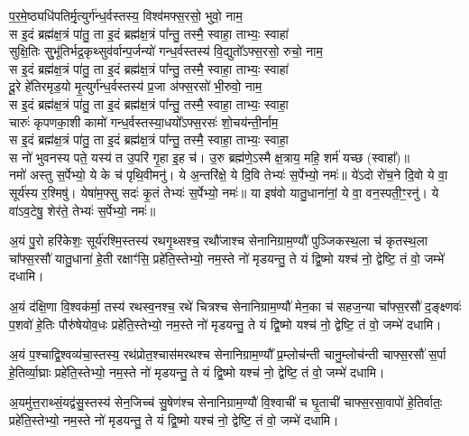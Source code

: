 प॒र॒मे॒ष्ठ्यधि॑पतिर्मृ॒त्युर्ग॑न्ध॒र्वस्तस्य॒ विश्व॑मफ्स॒रसो॒ भुवो॒  नाम॒\\
स इ॒दं ब्रह्म॑क्ष॒त्रं पा॑तु॒ ता इ॒दं ब्रह्म॑क्ष॒त्रं पा᳚न्तु॒ तस्मै॒ स्वाहा॒ ताभ्यः॒ स्वाहा॑\\
सुक्षि॒तिः सुुभू॑तिर्भद्र॒कृथ्सुव॑र्वान्प॒र्जन्यो॑ गन्ध॒र्वस्तस्य॑ वि॒द्युतो᳚ऽफ्स॒रसो॒ रुचो॒ नाम॒\\
स इ॒दं ब्रह्म॑क्ष॒त्रं पा॑तु॒ ता इ॒दं ब्रह्म॑क्ष॒त्रं पा᳚न्तु॒ तस्मै॒ स्वाहा॒ ताभ्यः॒ स्वाहा॑\\
दू॒रे हे॑तिरमृड॒यो मृ॒त्युर्ग॑न्ध॒र्वस्तस्य॑ प्र॒जा अ॑फ्स॒रसो॑ भी॒रुवो॒ नाम॒\\
स इ॒दं ब्रह्म॑क्ष॒त्रं पा॑तु॒ ता इ॒दं ब्रह्म॑क्ष॒त्रं पा᳚न्तु॒ तस्मै॒ स्वाहा॒ ताभ्यः॒ स्वाहा॒\\
चारुः॑ कृपणका॒शी कामो॑ गन्ध॒र्वस्तस्या॒धयो᳚ऽफ्स॒रसः॑ शो॒चय॑न्ती॒र्नाम॒\\
स इ॒दं ब्रह्म॑क्ष॒त्रं पा॑तु॒ ता इ॒दं ब्रह्म॑क्ष॒त्रं पा᳚न्तु॒ तस्मै॒ स्वाहा॒ ताभ्यः॒ स्वाहा॒\\
स नो॑ भुवनस्य पते॒ यस्य॑ त उ॒परि॑ गृ॒हा इ॒ह च॑।
उ॒रु ब्रह्म॑णे॒ऽस्मै क्ष॒त्राय॒ महि॒ शर्म॑ यच्छ (स्वाहा᳚)॥\\
नमो॑ अस्तु स॒र्पेभ्यो॒ ये के च॑ पृथि॒वीमनु॑।
ये अ॒न्तरि॑क्षे॒ ये दि॒वि  तेभ्यः॑ स॒र्पेभ्यो॒ नमः॑॥
ये॑ऽदो रो॑च॒ने दि॒वो ये वा॒ सूर्य॑स्य र॒श्मिषु॑।
येषा॑म॒फ्सु सदः॑ कृ॒तं तेभ्यः॑ स॒र्पेभ्यो॒ नमः॑॥
या इष॑वो यातु॒धाना॑नां॒ ये वा॒ वन॒स्पती॒ꣳ॒रनु॑।
ये वा॑ऽव॒टेषु॒ शेर॑ते॒ तेभ्यः॑ स॒र्पेभ्यो॒ नमः॑॥

अ॒यं पु॒रो हरि॑केशः॒ सूर्य॑रश्मि॒स्तस्य॑ रथगृ॒थ्सश्च॒ रथौ॑जाश्च सेनानिग्राम॒ण्यौ॑
पुञ्जिकस्थ॒ला च॑ कृतस्थ॒ला चा᳚फ्स॒रसौ॑ यातु॒धाना॑ हे॒ती रक्षाꣳ॑सि॒ 
प्रहे॑ति॒स्तेभ्यो॒ नम॒स्ते नो॑ मृडयन्तु॒ ते यं द्वि॒ष्मो यश्च॑ नो॒ द्वेष्टि॒ तं वो॒  जम्भे॑ दधामि।

अ॒यं द॑क्षि॒णा वि॒श्वक॑र्मा॒ तस्य॑ रथस्व॒नश्च॒ रथे॑ चित्रश्च  सेनानिग्राम॒ण्यौ॑
मेन॒का च॑ सहज॒न्या चा᳚फ्स॒रसौ॑ द॒ङ्क्ष्णवः॑ प॒शवो॑ हे॒तिः पौरु॑षेयोव॒धः
प्रहे॑ति॒स्तेभ्यो॒ नम॒स्ते नो॑ मृडयन्तु॒ ते यं द्वि॒ष्मो यश्च॑ नो॒ द्वेष्टि॒ तं वो॒  जम्भे॑ दधामि।

अ॒यं प॒श्चाद्वि॒श्वव्य॑चा॒स्तस्य॒ रथ॑प्रोत॒श्चास॑मरथश्च सेनानिग्राम॒ण्यौ᳚
प्र॒म्लोच॑न्ती चानु॒म्लोच॑न्ती चाफ्स॒रसौ॑ स॒र्पा हे॒तिर्व्या॒घ्राः 
प्रहे॑ति॒स्तेभ्यो॒ नम॒स्ते नो॑ मृडयन्तु॒ ते यं द्वि॒ष्मो यश्च॑ नो॒ द्वेष्टि॒ तं वो॒  जम्भे॑ दधामि।

अ॒यमु॑त्त॒राथ्सं॒यद्व॑सु॒स्तस्य॑ सेन॒जिच्च॑ सु॒षेण॑श्च सेनानिग्राम॒ण्यौ॑
वि॒श्वाची॑ च घृ॒ताची॑ चाफ्स॒रसा॒वापो॑ हे॒तिर्वातः॒ 
प्रहे॑ति॒स्तेभ्यो॒ नम॒स्ते नो॑ मृडयन्तु॒ ते यं द्वि॒ष्मो यश्च॑ नो॒ द्वेष्टि॒ तं वो॒  जम्भे॑ दधामि।

